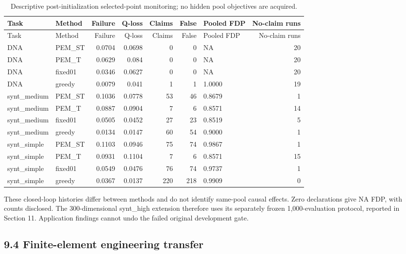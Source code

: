 \documentclass[11pt,a4paper]{article}
\begin{document}
\par\noindent\begin{minipage}{\linewidth}

\begin{longtable}[]{@{}llrrrrlr@{}}
\caption{Descriptive post-initialization selected-point monitoring; no
hidden pool objectives are acquired.}\tabularnewline
\toprule
Task & Method & Failure & Q-loss & Claims & False & Pooled FDP &
No-claim runs \\
\midrule
\endfirsthead
\toprule
Task & Method & Failure & Q-loss & Claims & False & Pooled FDP &
No-claim runs \\
\midrule
\endhead
DNA & PEM\_ST & 0.0704 & 0.0698 & 0 & 0 & NA & 20 \\
DNA & PEM\_T & 0.0629 & 0.084 & 0 & 0 & NA & 20 \\
DNA & fixed01 & 0.0346 & 0.0627 & 0 & 0 & NA & 20 \\
DNA & greedy & 0.0079 & 0.041 & 1 & 1 & 1.0000 & 19 \\
synt\_medium & PEM\_ST & 0.1036 & 0.0778 & 53 & 46 & 0.8679 & 1 \\
synt\_medium & PEM\_T & 0.0887 & 0.0904 & 7 & 6 & 0.8571 & 14 \\
synt\_medium & fixed01 & 0.0505 & 0.0452 & 27 & 23 & 0.8519 & 5 \\
synt\_medium & greedy & 0.0134 & 0.0147 & 60 & 54 & 0.9000 & 1 \\
synt\_simple & PEM\_ST & 0.1103 & 0.0946 & 75 & 74 & 0.9867 & 1 \\
synt\_simple & PEM\_T & 0.0931 & 0.1104 & 7 & 6 & 0.8571 & 15 \\
synt\_simple & fixed01 & 0.0549 & 0.0476 & 76 & 74 & 0.9737 & 1 \\
synt\_simple & greedy & 0.0367 & 0.0137 & 220 & 218 & 0.9909 & 0 \\
\bottomrule
\end{longtable}

\end{minipage}\par

These closed-loop histories differ between methods and do not identify
same-pool causal effects. Zero declarations give NA FDP, with counts
disclosed. The 300-dimensional synt\_high extension therefore uses its
separately frozen 1,000-evaluation protocol, reported in Section 11.
Application findings cannot undo the failed original development gate.

\hypertarget{finite-element-engineering-transfer}{%
\subsection{9.4 Finite-element engineering
transfer}\label{finite-element-engineering-transfer}}
\end{document}
